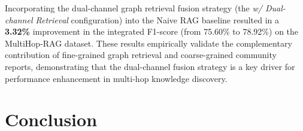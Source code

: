 \documentclass[11pt]{article}
\begin{document}
\begin{table}[H]
    \centering
    \caption{Ablation Study Results: Dual-Channel Retrieval Fusion}
    \label{tab:ablation_dual_channel}
    \setlength{\tabcolsep}{3pt}
    \small
\end{table}

Incorporating the dual-channel graph retrieval fusion strategy (the \textit{w/ Dual-channel Retrieval} configuration) into the Naive RAG baseline resulted in a \textbf{3.32\%} improvement in the integrated F1-score (from 75.60\% to 78.92\%) on the MultiHop-RAG dataset. These results empirically validate the complementary contribution of fine-grained graph retrieval and coarse-grained community reports, demonstrating that the dual-channel fusion strategy is a key driver for performance enhancement in multi-hop knowledge discovery.

\section{Conclusion}
\end{document}
